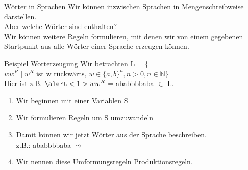 \begin{frame}[fragile]{Wörter in Sprachen}
Wir können inzwischen Sprachen in Mengenschreibweise darstellen.\\Aber welche Wörter sind enthalten?\\
\vspace{0.3cm}
Wir können weitere Regeln formulieren, mit denen wir von einem gegebenen Startpunkt aus alle Wörter einer Sprache erzeugen können.
\end{frame}

\begin{frame}[fragile]{Beispiel Worterzeugung}
    \small{Wir betrachten L = \{$ww^R\;|\;w^R\text{ ist w rückwärts, }w \in \{a, b\}^n, n>0, n\in \mathbb{N}$\}\\
    Hier ist z.B. $\alert<1>{w}w^R$ = \alert<1>{ababb}bbaba $\in$ L.}\\
    \begin{enumerate}
    \item <2-> 
            \alert<2,5>{Wir beginnen mit einer Variablen S}
    \item <3-> 
            \alert<3>{Wir formulieren Regeln um S umzuwandeln}
            \alert<4>{}\vspace{-0.3in}
    \item <5->
            \alert<5>{Damit können wir jetzt Wörter aus der Sprache beschreiben.}\\
            z.B.: \alert<6>{a}\alert<7>{b}\alert<8>{a}\alert<9>{b}\alert<10>{bb}\alert<9>{b}\alert<8>{a}\alert<7>{b}\alert<6>{a} $\leadsto$ 
    \item <11> \alert<11>{Wir nennen diese Umformungsregeln Produktionsregeln.}
    \end{enumerate}
\end{frame}

